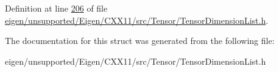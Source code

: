 Definition at line \hyperlink{eigen_2unsupported_2_eigen_2_c_x_x11_2src_2_tensor_2_tensor_dimension_list_8h_source_l00206}{206} of file \hyperlink{eigen_2unsupported_2_eigen_2_c_x_x11_2src_2_tensor_2_tensor_dimension_list_8h_source}{eigen/unsupported/\+Eigen/\+C\+X\+X11/src/\+Tensor/\+Tensor\+Dimension\+List.\+h}.



The documentation for this struct was generated from the following file\+:\begin{DoxyCompactItemize}
\item 
eigen/unsupported/\+Eigen/\+C\+X\+X11/src/\+Tensor/\+Tensor\+Dimension\+List.\+h\end{DoxyCompactItemize}
